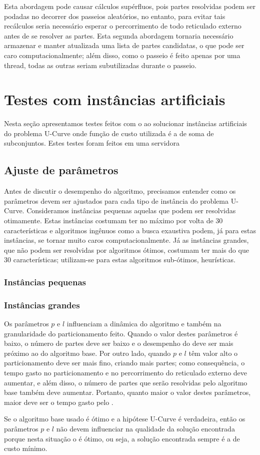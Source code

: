 Esta abordagem pode causar cálculos supérfluos, pois partes resolvidas
podem ser podadas no decorrer dos passeios aleatórios, no entanto, para 
evitar tais recálculos seria necessário esperar o percorrimento de todo
reticulado externo antes de se resolver as partes. Esta segunda 
abordagem tornaria necessário armazenar e manter atualizada uma lista de 
partes candidatas, o que pode ser caro computacionalmente; além disso, 
como o passeio é feito apenas por uma thread, todas as outras seriam
subutilizadas durante o passeio. 

\section{Testes com instâncias artificiais}
Nesta seção apresentamos testes feitos com o  ao  
solucionar instâncias artificiais do problema U-Curve onde função de 
custo utilizada é a de soma de subconjuntos. Estes testes foram feitos
em uma servidora %

\subsection{Ajuste de parâmetros}
Antes de discutir o desempenho do algoritmo, precisamos entender como
os parâmetros devem ser ajustados para cada tipo de instância do 
problema U-Curve. Consideramos instâncias pequenas aquelas que podem ser
resolvidas otimamente. Estas instâncias costumam ter no máximo por volta
de 30 características e algoritmos ingênuos como a busca exaustiva 
podem, já para estas instâncias, se tornar muito caros 
computacionalmente. Já as instâncias grandes, que não podem ser 
resolvidas por algoritmos ótimos, costumam ter mais do que 30 
características; utilizam-se para estas algoritmos sub-ótimos, 
heurísticas.

\subsubsection{Instâncias pequenas}


\subsubsection{Instâncias grandes}
Os parâmetros $p$ e $l$ influenciam a dinâmica do algoritmo e também na
granularidade do particionamento feito. Quando o valor destes parâmetros
é baixo, o número de partes deve ser baixo e o desempenho do 
 deve ser mais próximo ao do algoritmo base.  Por outro 
lado, quando $p$ e $l$ têm valor alto o particionamento deve ser mais 
fino, criando mais partes; como consequência, o tempo gasto no 
particionamento e no percorrimento do reticulado externo deve aumentar, 
e além disso, o número de partes que serão resolvidas pelo algoritmo 
base também deve aumentar. Portanto, quanto maior o valor destes 
parâmetros, maior deve ser o tempo gasto pelo .

Se o algoritmo base usado é ótimo e a hipótese U-Curve é verdadeira, 
então os parâmetros $p$ e $l$ não devem influenciar na qualidade da 
solução encontrada porque nesta situação o  é ótimo, ou 
seja, a solução encontrada sempre é a de custo mínimo. 
